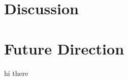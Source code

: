 \documentclass[phd,bottom,nosig]{usbthesis}
\begin{document}
\chapter{Discussion}\label{chap:discussion}



\chapter{Future Direction}\label{chap:future}


\appendix
hi there



%
%



\end{document}
